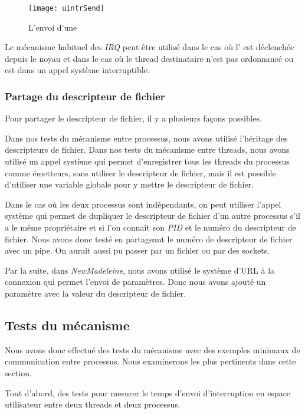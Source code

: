 \begin{figure}[H]
  \texttt{[image: uintrSend]}
  \caption{L'envoi d'une \uintr{}}
  \label{fig:sendUintr}
\end{figure}

Le mécanisme habituel des \emph{IRQ} peut être utilisé dans le cas où l'\uintr{} est déclenchée depuis le noyau et
dans le cas où le thread destinataire n'est pas ordonnancé ou est dans un appel système interruptible.

\subsubsection{Partage du descripteur de fichier}
\label{sec:shareFD}

Pour partager le descripteur de fichier, il y a plusieurs façons possibles.

Dans nos tests du mécanisme entre processus, nous avons utilisé l'héritage des descripteurs de fichier.
Dans nos tests du mécanisme entre threads, nous avons utilisé un appel système qui permet d'enregistrer tous les threads du processus comme émetteurs, sans utiliser le descripteur de fichier, %
mais il est possible d'utiliser une variable globale pour y mettre le descripteur de fichier.

Dans le cas où les deux processus sont indépendants, on peut utiliser l'appel système  qui permet de dupliquer le descripteur de fichier d'un autre processus s'il a le même propriétaire et si l'on connaît son \emph{PID} et le numéro du descripteur de fichier.
Nous avons donc testé en partageant le numéro de descripteur de fichier avec un pipe.
On aurait aussi pu passer par un fichier ou par des sockets.

Par la suite, dans \emph{NewMadeleine}, nous avons utilisé le système d'URL à la connexion qui permet l'envoi de paramètres.
Donc nous avons ajouté un paramètre avec la valeur du descripteur de fichier.

\subsection{Tests du mécanisme}

Nous avons donc effectué des tests du mécanisme avec des exemples minimaux de communication entre processus.
Nous examinerons les plus pertinents dans cette section.

Tout d'abord, des tests pour mesurer le temps d'envoi d'interruption en espace utilisateur entre deux threads et deux processus.

